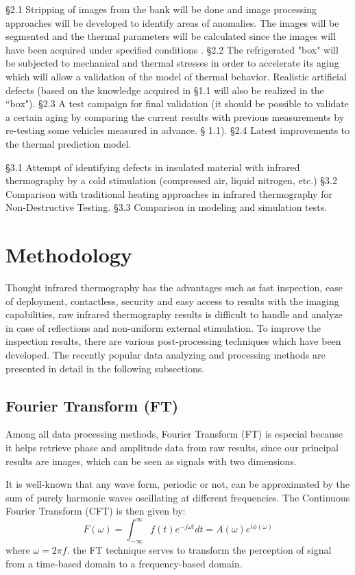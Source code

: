 \S 2.1 Stripping of images from the bank will be done and image processing approaches will be developed to identify areas of anomalies. The images will be segmented and the thermal parameters will be calculated since the images will have been acquired under specified conditions \citep{Ibarra-Castanedo2013Methods}. §2.2 The refrigerated "box" will be subjected to mechanical and thermal stresses in order to accelerate its aging which will allow a validation of the model of thermal behavior. Realistic artificial defects (based on the knowledge acquired in §1.1 will also be realized in the ``box"). §2.3 A test campaign for final validation (it should be possible to validate a certain aging by comparing the current results with previous measurements by re-testing some vehicles measured in advance. § 1.1). §2.4 Latest improvements to the thermal prediction model.

\S 3.1 Attempt of identifying defects in insulated material with infrared thermography by a cold stimulation (compressed air, liquid nitrogen, etc.) \S 3.2 Comparison with traditional heating approaches in infrared thermography for Non-Destructive Testing. \S 3.3 Comparison in modeling and simulation tests.

\section{Methodology}
Thought infrared thermography has the advantages such as fast inspection, ease of deployment, contactless, security and easy access to results with the imaging capabilities, raw infrared thermography results is difficult to handle and analyze in case of reflections and non-uniform external stimulation. To improve the inspection results, there are various post-processing techniques which have been developed. The recently popular data analyzing and processing methods are presented in detail in the following subsections.
\subsection{Fourier Transform (FT)}
Among all data processing methods, Fourier Transform (FT) is especial because it helps retrieve phase and amplitude data from raw results, since our principal results are images, which can be seen as signals with two dimensions.

It is well-known that any wave form, periodic or not, can be approximated by the sum of purely harmonic waves oscillating at different frequencies. The Continuous Fourier Transform (CFT) is then given by:
\begin{equation}
F(\omega) = \int_{-\infty}^{\infty}f(t)e^{-j\omega t}dt = A(\omega)e^{i\phi(\omega)}
\end{equation}
where $\omega = 2 \pi f$. the FT technique serves to transform the perception of signal from a time-based domain to a frequency-based domain.

